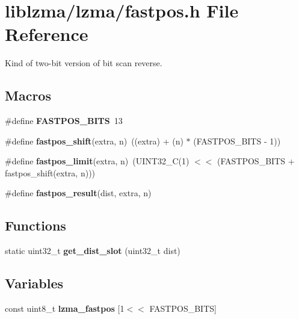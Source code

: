 \section{liblzma/lzma/fastpos.h File Reference}
\label{fastpos_8h}


Kind of two-\/bit version of bit scan reverse.  


\subsection*{Macros}
\begin{DoxyCompactItemize}
\item 
\#define {\bfseries F\-A\-S\-T\-P\-O\-S\-\_\-\-B\-I\-T\-S}~13\label{fastpos_8h_a665cd9527e83a1e2e33ace2ea28dd155}

\item 
\#define {\bfseries fastpos\-\_\-shift}(extra, n)~((extra) + (n) $\ast$ (F\-A\-S\-T\-P\-O\-S\-\_\-\-B\-I\-T\-S -\/ 1))\label{fastpos_8h_a89c400de0bc8ad6c6ebc82a1d90a92aa}

\item 
\#define {\bfseries fastpos\-\_\-limit}(extra, n)~(U\-I\-N\-T32\-\_\-\-C(1) $<$$<$ (F\-A\-S\-T\-P\-O\-S\-\_\-\-B\-I\-T\-S + fastpos\-\_\-shift(extra, n)))\label{fastpos_8h_a59bad784e2d2ed950f5b5d0aab440d4a}

\item 
\#define {\bfseries fastpos\-\_\-result}(dist, extra, n)
\end{DoxyCompactItemize}
\subsection*{Functions}
\begin{DoxyCompactItemize}
\item 
static uint32\-\_\-t {\bfseries get\-\_\-dist\-\_\-slot} (uint32\-\_\-t dist)\label{fastpos_8h_a8ab46c41c29a18f79e38c0f5f3a2e025}

\end{DoxyCompactItemize}
\subsection*{Variables}
\begin{DoxyCompactItemize}
\item 
const uint8\-\_\-t {\bfseries lzma\-\_\-fastpos} [1$<$$<$ F\-A\-S\-T\-P\-O\-S\-\_\-\-B\-I\-T\-S]\label{fastpos_8h_a4c268bf2a70a18b8a3569cf2a9c7b50f}

\end{DoxyCompactItemize}


